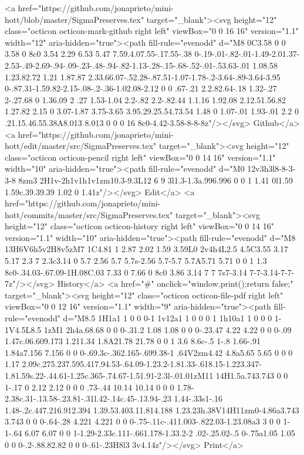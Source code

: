       <a href="https://github.com/jonaprieto/mini-hott/blob/master/SigmaPreserves.tex" target="_blank"><svg height="12" class="octicon octicon-mark-github right left" viewBox="0 0 16 16" version="1.1" width="12" aria-hidden="true"><path fill-rule="evenodd" d="M8 0C3.58 0 0 3.58 0 8c0 3.54 2.29 6.53 5.47 7.59.4.07.55-.17.55-.38 0-.19-.01-.82-.01-1.49-2.01.37-2.53-.49-2.69-.94-.09-.23-.48-.94-.82-1.13-.28-.15-.68-.52-.01-.53.63-.01 1.08.58 1.23.82.72 1.21 1.87.87 2.33.66.07-.52.28-.87.51-1.07-1.78-.2-3.64-.89-3.64-3.95 0-.87.31-1.59.82-2.15-.08-.2-.36-1.02.08-2.12 0 0 .67-.21 2.2.82.64-.18 1.32-.27 2-.27.68 0 1.36.09 2 .27 1.53-1.04 2.2-.82 2.2-.82.44 1.1.16 1.92.08 2.12.51.56.82 1.27.82 2.15 0 3.07-1.87 3.75-3.65 3.95.29.25.54.73.54 1.48 0 1.07-.01 1.93-.01 2.2 0 .21.15.46.55.38A8.013 8.013 0 0 0 16 8c0-4.42-3.58-8-8-8z"/></svg> Github</a>
      <a href="https://github.com/jonaprieto/mini-hott/edit/master/src/SigmaPreserves.tex" target="_blank"><svg height="12" class="octicon octicon-pencil right left" viewBox="0 0 14 16" version="1.1" width="10" aria-hidden="true"><path fill-rule="evenodd" d="M0 12v3h3l8-8-3-3-8 8zm3 2H1v-2h1v1h1v1zm10.3-9.3L12 6 9 3l1.3-1.3a.996.996 0 0 1 1.41 0l1.59 1.59c.39.39.39 1.02 0 1.41z"/></svg> Edit</a>
      <a href="https://github.com/jonaprieto/mini-hott/commits/master/src/SigmaPreserves.tex" target="_blank"><svg height="12" class="octicon octicon-history right left" viewBox="0 0 14 16" version="1.1" width="10" aria-hidden="true"><path fill-rule="evenodd" d="M8 13H6V6h5v2H8v5zM7 1C4.81 1 2.87 2.02 1.59 3.59L0 2v4h4L2.5 4.5C3.55 3.17 5.17 2.3 7 2.3c3.14 0 5.7 2.56 5.7 5.7s-2.56 5.7-5.7 5.7A5.71 5.71 0 0 1 1.3 8c0-.34.03-.67.09-1H.08C.03 7.33 0 7.66 0 8c0 3.86 3.14 7 7 7s7-3.14 7-7-3.14-7-7-7z"/></svg> History</a>
      <a  href="#" onclick="window.print();return false;" target="_blank"><svg height="12" class="octicon octicon-file-pdf right left" viewBox="0 0 12 16" version="1.1" width="9" aria-hidden="true"><path fill-rule="evenodd" d="M8.5 1H1a1 1 0 0 0-1 1v12a1 1 0 0 0 1 1h10a1 1 0 0 0 1-1V4.5L8.5 1zM1 2h4a.68.68 0 0 0-.31.2 1.08 1.08 0 0 0-.23.47 4.22 4.22 0 0 0-.09 1.47c.06.609.173 1.211.34 1.8A21.78 21.78 0 0 1 3.6 8.6c-.5 1-.8 1.66-.91 1.84a7.156 7.156 0 0 0-.69.3c-.362.165-.699.38-1 .64V2zm4.42 4.8a5.65 5.65 0 0 0 1.17 2.09c.275.237.595.417.94.53-.64.09-1.23.2-1.81.33-.618.15-1.223.347-1.81.59s.22-.44.61-1.25c.365-.74.67-1.51.91-2.3l-.01.01zM11 14H1.5a.743.743 0 0 1-.17 0 2.12 2.12 0 0 0 .73-.44 10.14 10.14 0 0 0 1.78-2.38c.31-.13.58-.23.81-.31l.42-.14c.45-.13.94-.23 1.44-.33s1-.16 1.48-.2c.447.216.912.394 1.39.53.403.11.814.188 1.23.23h.38V14H11zm0-4.86a3.743 3.743 0 0 0-.64-.28 4.221 4.221 0 0 0-.75-.11c-.411.003-.822.03-1.23.08a3 3 0 0 1-1-.64 6.07 6.07 0 0 1-1.29-2.33c.111-.661.178-1.33.2-2 .02-.25.02-.5 0-.75a1.05 1.05 0 0 0-.2-.88.82.82 0 0 0-.61-.23H8l3 3v4.14z"/></svg> Print</a>
